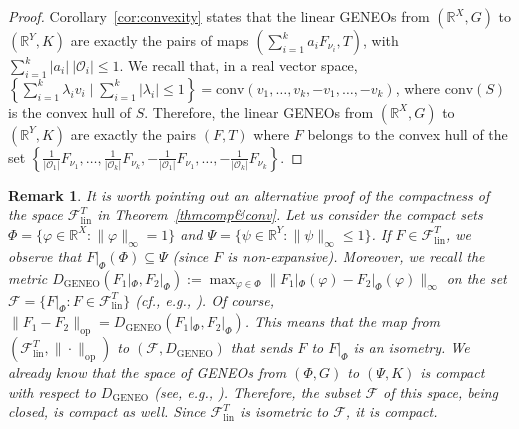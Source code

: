 \documentclass[11pt]{article}
\newcommand{\R}{\mathbb{R}}
\newtheorem{rem}[theorem]{Remark}
\begin{document}
{\begin{proof}
Corollary~\ref{cor:convexity} states that 
the linear GENEOs from $(\R^X,G)$ to $(\R^Y,K)$ are exactly the pairs of maps  
$(\sum_{i=1}^k a_i F_{\nu_i},T)$, with  $\sum_{i=1}^k |a_i|\ |\mathcal{O}_i|\le 1$. We recall that, in a real vector space, $\left\{ \sum_{i=1}^k \lambda_iv_i \mid \sum_{i=1}^k |\lambda_i|\le 1 \right\}=\mathrm{conv}
(v_1,\ldots,v_k,-v_1,\ldots,-v_k)$, where $\mathrm{conv}(S)$ is the convex hull of $S$.
Therefore, the linear GENEOs from $(\R^X,G)$ to $(\R^Y,K)$ are exactly the pairs
$(F,T)$ where $F$ belongs to the convex hull of the set
    $\left\{\frac{1}{|\mathcal{O}_1|}F_{\nu_1},\ldots, 
    \frac{1}{|\mathcal{O}_k|}F_{\nu_k},
    -\frac{1}{|\mathcal{O}_1|}F_{\nu_1},\ldots, 
    -\frac{1}{|\mathcal{O}_k|}F_{\nu_k}\right\}$.
\end{proof}


\begin{rem}
It is worth pointing out an alternative proof of the compactness of the space $\mathcal{F}^T_\mathrm{lin}$ in Theorem~\ref{thmcomp&conv}.
Let us consider the compact sets
$\Phi = \{\varphi \in \mathbb{R}^X : \|\varphi\|_\infty = 1\}$ and $\Psi = \{\psi \in \mathbb{R}^Y : \|\psi\|_\infty \le 1\}$.
If $F \in \mathcal{F}^T_{\mathrm{lin}}$, we observe that
$F|_{\Phi}(\Phi) \subseteq \Psi$ (since $F$ is non-expansive). Moreover, we recall the metric
$D_{\mathrm{GENEO}}(F_1|_{\Phi}, F_2|_{\Phi})
:=
\max_{\varphi \in \Phi}
\|F_1|_{\Phi}(\varphi) - F_2|_{\Phi}(\varphi)\|_\infty$ on the set $\mathcal{F}=\{F|_{\Phi}:F\in \mathcal{F}^T_\mathrm{lin}\}$
(cf., e.g., \cite{bergomi2019towards}).
Of course,
$\|F_1 - F_2\|_{\mathrm{op}}
=
D_{\mathrm{GENEO}}(F_1|_{\Phi}, F_2|_{\Phi})$.
This means that the map from $(\mathcal{F}^T_\mathrm{lin},\|\cdot\|_{\mathrm{op}})$
to $(\mathcal{F},D_{\mathrm{GENEO}})$ that sends $F$ to $F|_{\Phi}$
is an isometry.
We already know that the space of GENEOs from
$(\Phi, G)$ to $(\Psi, K)$ is compact with respect to 
$D_{\mathrm{GENEO}}$ (see, e.g., \cite{bergomi2019towards}).
Therefore, the subset $\mathcal{F}$ of this space, being closed, is compact as well. Since 
$\mathcal{F}^T_\mathrm{lin}$ is isometric to 
$\mathcal{F}$, it is compact.
\end{rem}

}
\end{document}
